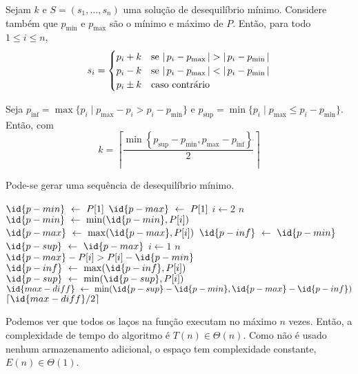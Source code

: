 \def\pmin{\ensuremath{p_{\min}}\xspace}
\def\pmax{\ensuremath{p_{\max}}\xspace}
\def\pinf{\ensuremath{p_{\mathrm{inf}}}\xspace}
\def\psup{\ensuremath{p_{\mathrm{sup}}}\xspace}

\begin{theorem}
    Sejam $k$ e $S = (s_1, \ldots, s_n)$ uma solução de desequilíbrio mínimo. Considere também que \pmin e \pmax são o mínimo e máximo de $P$. Então, para todo $1 \leq i \leq n$,
    \[
        s_i = \begin{cases}
            p_i + k & \text{se } \abs{p_i - \pmax} > \abs{p_i - \pmin} \\
            p_i - k & \text{se } \abs{p_i - \pmax} < \abs{p_i - \pmin} \\
            p_i \pm k & \text{caso contrário}
        \end{cases}
    \]
\end{theorem}

\itemdsep

\begin{theorem}
    Seja $\pinf = \max\{p_i \mid \pmax - p_i > p_i - \pmin\}$ e $\psup = \min\{p_i \mid \pmax \leq p_i - \pmin\}$. Então, com
    \[
        k = \left\lceil\frac{\min\left\{\psup - \pmin, \pmax - \pinf\right\}}{2}\right\rceil
    \]

    Pode-se gerar uma sequência de desequilíbrio mínimo.
\end{theorem}

\itemdsep

\begin{codebox}
    \li $\id{p-min} \gets P[1]$
    \li $\id{p-max} \gets P[1]$
    \li {} $i \gets 2$  $n$
        \Do
    \li     $\id{p-min} \gets \min(\id{p-min}, P[i])$
    \li     $\id{p-max} \gets \max(\id{p-max}, P[i])$
        \End
    \li
    \li $\id{p-inf} \gets \id{p-min}$
    \li $\id{p-sup} \gets \id{p-max}$
    \li {} $i \gets 1$  $n$
        \Do
    \li     {} $\id{p-max} - P[i] > P[i] - \id{p-min}$ 
            \Do
    \li         $\id{p-inf} \gets \max(\id{p-inf}, P[i])$
            \End
    \li     {}
            \Do
    \li         $\id{p-sup} \gets \min(\id{p-sup}, P[i])$
            \End
        \End
    \li
    \li $\id{max-diff} \gets \min(\id{p-sup} - \id{p-min}, \id{p-max} - \id{p-inf})$
    \li {} $\lceil \id{max-diff} / 2 \rceil$
\end{codebox}

\itemdsep

Podemos ver que todos os laços na função executam no máximo $n$ vezes. Então, a complexidade de tempo do algoritmo é $T(n) \in \Theta(n)$. Como não é usado nenhum armazenamento adicional, o espaço tem complexidade constante, $E(n) \in \Theta(1)$.
